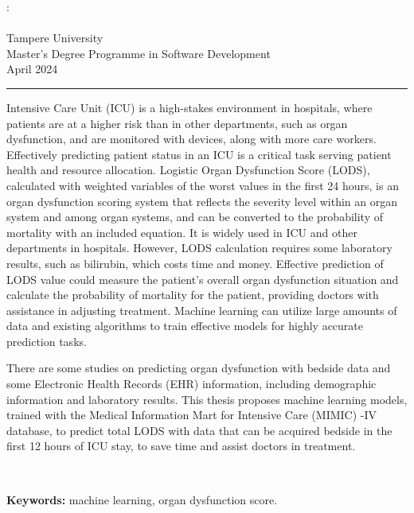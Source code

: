 \documentclass[12pt,a4paper,english
]{tunithesis}
\begin{document}
\begin{spacing}{1.0}
\noindent \@author: \@title\\
\@thesistype\\
Tampere University\\
Master’s Degree Programme in Software Development\\
April 2024
\end{spacing}
\noindent\rule{12cm}{0.4pt}

\vspace{0.5cm}


\noindent Intensive Care Unit (ICU) is a high-stakes environment in hospitals, where patients are at a higher risk than in other departments, such as organ dysfunction, and are monitored with devices, along with more care workers. Effectively predicting patient status in an ICU is a critical task serving patient health and resource allocation. Logistic Organ Dysfunction Score (LODS), calculated with weighted variables of the worst values in the first 24 hours, is an organ dysfunction scoring system that reflects the severity level within an organ system and among organ systems, and can be converted to the probability of mortality with an included equation. It is widely used in ICU and other departments in hospitals. However, LODS calculation requires some laboratory results, such as bilirubin, which costs time and money. Effective prediction of LODS value could measure the patient's overall organ dysfunction situation and calculate the probability of mortality for the patient, providing doctors with assistance in adjusting treatment. Machine learning can utilize large amounts of data and existing algorithms to train effective models for highly accurate prediction tasks.

\noindent There are some studies on predicting organ dysfunction with bedside data and some Electronic Health Records (EHR) information, including demographic information and laboratory results. This thesis proposes machine learning models, trained with the Medical Information Mart for Intensive Care (MIMIC) -IV database, to predict total LODS with data that can be acquired bedside in the first 12 hours of ICU stay, to save time and assist doctors in treatment. 




~

\noindent\textbf{Keywords:} machine learning, organ dysfunction score.
\end{document}
